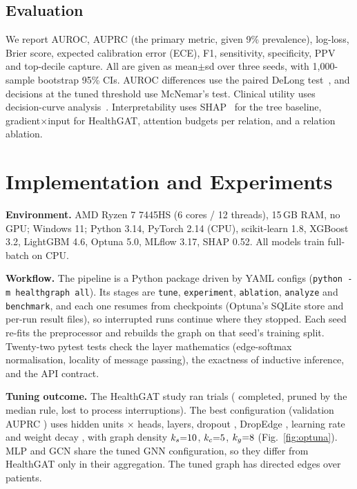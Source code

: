 \documentclass[conference]{IEEEtran}
\begin{document}
\subsection{Evaluation}
We report AUROC, AUPRC (the primary metric, given 9\% prevalence), log-loss, Brier score,
expected calibration error (ECE), F1, sensitivity, specificity, PPV and top-decile capture. All
are given as mean$\pm$sd over three seeds, with 1{,}000-sample bootstrap 95\% CIs. AUROC
differences use the paired DeLong test~\cite{delong1988,sun2014}, and decisions at the tuned
threshold use McNemar's test. Clinical utility uses decision-curve analysis~\cite{vickers2006}.
Interpretability uses SHAP~\cite{lundberg2017} for the tree baseline, gradient$\times$input for
HealthGAT, attention budgets per relation, and a relation ablation.

\section{Implementation and Experiments}
\textbf{Environment.} AMD Ryzen 7 7445HS (6 cores / 12 threads), 15\,GB RAM, no GPU; Windows 11;
Python 3.14, PyTorch 2.14 (CPU), scikit-learn 1.8, XGBoost 3.2, LightGBM 4.6, Optuna 5.0,
MLflow 3.17, SHAP 0.52. All models train full-batch on CPU.

\textbf{Workflow.} The pipeline is a Python package driven by YAML configs
(\texttt{python -m healthgraph all}). Its stages are \texttt{tune}, \texttt{experiment},
\texttt{ablation}, \texttt{analyze} and \texttt{benchmark}, and each one resumes from
checkpoints (Optuna's SQLite store and per-run result files), so interrupted runs continue
where they stopped. Each seed re-fits the preprocessor and
rebuilds the graph on that seed's training split. Twenty-two pytest tests check the layer
mathematics (edge-softmax normalisation, locality of message passing), the exactness of
inductive inference, and the API contract.

\textbf{Tuning outcome.} The HealthGAT study ran \nTrials{} trials (\nComplete{} completed,
\nPruned{} pruned by the median rule, \nInterrupted{} lost to process interruptions). The best
configuration (validation AUPRC \bestValAuprc) uses \besthidden{} hidden units $\times$
\bestheads{} heads, \bestlayers{} layers, dropout \bestdropout, DropEdge \bestedgedropout,
learning rate \bestlr{} and weight decay \bestweightdecay, with graph density $k_s{=}10$,
$k_c{=}5$, $k_g{=}8$ (Fig.~\ref{fig:optuna}). MLP and GCN share the tuned
GNN configuration, so they differ from HealthGAT only in their aggregation. The tuned graph has
\nEdges{} directed edges over \nRef{} patients.
\end{document}
